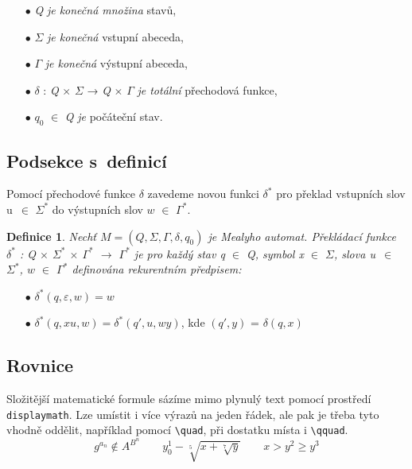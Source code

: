\documentclass[a4paper, twocolumn, 11pt]{article}
\newtheorem{theorem}{Definice}
\begin{document}
\begin{itemize}
\item[$\bullet$] \textit{Q} \textit{je konečná množina} stavů,
\item[$\bullet$] $\mathit\Sigma$ \textit{je konečná} vstupní abeceda,
\item[$\bullet$] $\mathit\Gamma$ \textit{je konečná} výstupní abeceda,
\item[$\bullet$] $\delta$ : \textit{Q} $\times$ $\mathit\Sigma$ → \textit{Q} $\times$ $\mathit\Gamma$ \textit{je totální} přechodová funkce,
\item[$\bullet$] $q_0$ $\in$ \textit{Q} \textit{je} počáteční stav.
\end{itemize}

\subsection{Podsekce s~definicí}

Pomocí přechodové funkce $\delta$ zavedeme novou funkci $\delta^*$
pro překlad vstupních slov u~$\in$ $\mathit\Sigma^*$ do výstupních slov
$w$ $\in$ $\mathit\Gamma^*$.
\begin{theorem}
    Nechť $M = (\mathit{Q}, \mathit\Sigma, \mathit\Gamma, \delta, q_0)$ je Mea\-ly\-ho
    automat. \emph{Překládací funkce} $\delta^*$ : Q $\times$ $\mathit\Sigma^*$ $\times$  $\mathit\Gamma^*$ $\rightarrow$ $\mathit\Gamma^*$
    je pro každý stav q $\in$ Q, symbol x $\in$ $\mathit\Sigma$, slova u~$\in$ $\mathit\Sigma^*$,
    $w$ $\in$ $\mathit\Gamma^*$ definována rekurentním předpisem:
\end{theorem} 

\begin{itemize}
\item[$\bullet$] $\delta^*(q,\varepsilon, w) = w$
\item[$\bullet$] $\delta^*(q,xu,w) = \delta^*(q',u,wy)$, kde $(q',y)$ = $\delta(q,x)$
\end{itemize}

\subsection{Rovnice}
Složitější matematické formule sázíme mimo plynulý
text pomocí prostředí \texttt{displaymath}. Lze umístit i více
výrazů na jeden řádek, ale pak je třeba tyto vhodně
oddělit, například pomocí \verb|\quad|, při dostatku místa
i \verb|\qquad|.
\begin{displaymath}
    g^{a_n} \notin A^{B^n} \qquad y^1_0 - \sqrt[5]{x + \sqrt[7]{y}}\qquad x > y^2 \geq y^3
\end{displaymath}
\end{document}
